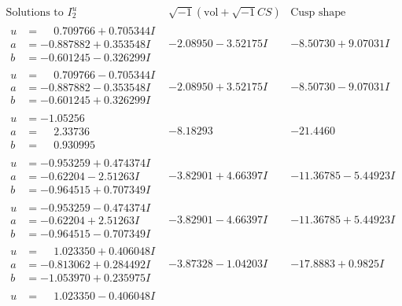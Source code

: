 \documentclass[1p]{elsarticle_modified}
\theoremstyle{definition}
\newcommand{\I}{\sqrt{-1}}
\begin{document}
$$\begin{array}{c|c|c}  
\text{Solutions to }I^u_{2}& \I (\text{vol} + \sqrt{-1}CS) & \text{Cusp shape}\\
 \hline 
\begin{aligned}
u &= \phantom{-}0.709766 + 0.705344 I \\
a &= -0.887882 + 0.353548 I \\
b &= -0.601245 - 0.326299 I\end{aligned}
 & -2.08950 - 3.52175 I & -8.50730 + 9.07031 I \\ \hline\begin{aligned}
u &= \phantom{-}0.709766 - 0.705344 I \\
a &= -0.887882 - 0.353548 I \\
b &= -0.601245 + 0.326299 I\end{aligned}
 & -2.08950 + 3.52175 I & -8.50730 - 9.07031 I \\ \hline\begin{aligned}
u &= -1.05256\phantom{ +0.000000I} \\
a &= \phantom{-}2.33736\phantom{ +0.000000I} \\
b &= \phantom{-}0.930995\phantom{ +0.000000I}\end{aligned}
 & -8.18293\phantom{ +0.000000I} & -21.4460\phantom{ +0.000000I} \\ \hline\begin{aligned}
u &= -0.953259 + 0.474374 I \\
a &= -0.62204 - 2.51263 I \\
b &= -0.964515 + 0.707349 I\end{aligned}
 & -3.82901 + 4.66397 I & -11.36785 - 5.44923 I \\ \hline\begin{aligned}
u &= -0.953259 - 0.474374 I \\
a &= -0.62204 + 2.51263 I \\
b &= -0.964515 - 0.707349 I\end{aligned}
 & -3.82901 - 4.66397 I & -11.36785 + 5.44923 I \\ \hline\begin{aligned}
u &= \phantom{-}1.023350 + 0.406048 I \\
a &= -0.813062 + 0.284492 I \\
b &= -1.053970 + 0.235975 I\end{aligned}
 & -3.87328 - 1.04203 I & -17.8883 + 0.9825 I \\ \hline\begin{aligned}
u &= \phantom{-}1.023350 - 0.406048 I \\

\end{aligned}
\end{array}$$
\end{document}
